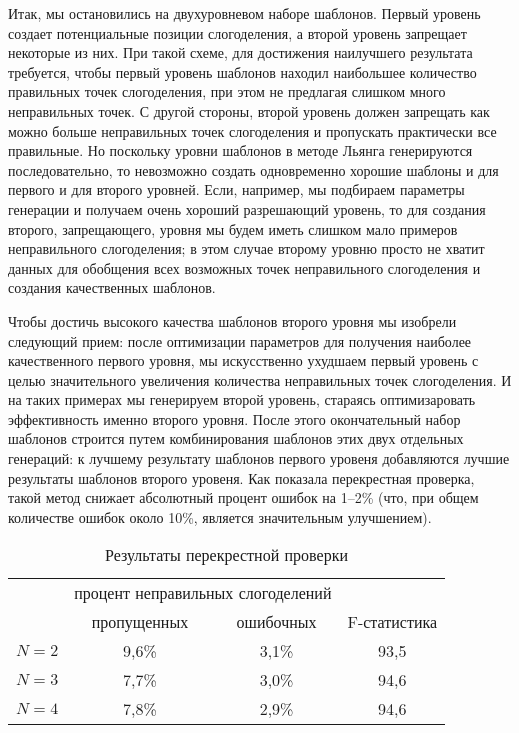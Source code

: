 \documentclass[12pt,a4paper,oneside]{extarticle}
\begin{document}
Итак, мы остановились на двухуровневом наборе шаблонов. Первый уровень создает потенциальные позиции слогоделения, а второй уровень запрещает некоторые из них. При такой схеме, для достижения наилучшего результата требуется, чтобы первый уровень шаблонов находил наибольшее количество правильных точек слогоделения, при этом не предлагая слишком много неправильных точек. С другой стороны, второй уровень должен запрещать как можно больше неправильных точек слогоделения и пропускать практически все правильные. Но поскольку уровни шаблонов в методе Льянга генерируются последовательно, то невозможно создать одновременно хорошие шаблоны и для первого и для второго уровней. Если, например, мы подбираем параметры генерации и получаем очень хороший разрешающий уровень, то для создания второго, запрещающего, уровня мы будем иметь слишком мало примеров неправильного слогоделения; в этом случае второму уровню просто не хватит данных для обобщения всех возможных точек неправильного слогоделения и создания качественных шаблонов. %

Чтобы достичь высокого качества шаблонов второго уровня мы изобрели следующий прием: после оптимизации параметров для получения наиболее качественного первого уровня, мы искусственно ухудшаем первый уровень с целью значительного увеличения количества неправильных точек слогоделения. И на таких примерах мы генерируем второй уровень, стараясь оптимизаровать эффективность именно второго уровня. После этого окончательный набор шаблонов строится путем комбинирования шаблонов этих двух отдельных генераций: к лучшему результату шаблонов первого уровеня добавляются лучшие результаты шаблонов второго уровеня. Как показала перекрестная проверка, такой метод снижает абсолютный процент ошибок на 1--2\% (что, при общем количестве ошибок около 10\%, является значительным улучшением).

\begin{table}[ht]
\centering
\caption{Результаты перекрестной проверки \label{validation_results}}
\begin{tabular}{cccc}
		&	\multicolumn{2}{c}{процент неправильных слогоделений} & \\
		&	пропущенных		& ошибочных	& F-статистика \\
\hline
$N = 2$	& 	9,6\%			& 	3,1\% 	&	93,5 \\
$N = 3$ 	& 	7,7\%			& 	3,0\% 	& 	94,6	\\
$N = 4$ 	&	7,8\%			& 	2,9\% 	& 	94,6	\\
\hline
\end{tabular}
\end{table}
\end{document}
